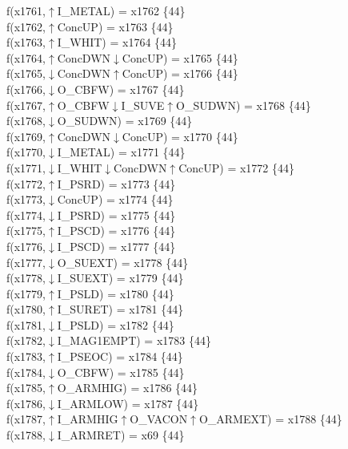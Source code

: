 f(x1761,$\uparrow$I\_METAL) = x1762 \{44\} \\  
f(x1762,$\uparrow$ConcUP) = x1763 \{44\} \\  
f(x1763,$\uparrow$I\_WHIT) = x1764 \{44\} \\  
f(x1764,$\uparrow$ConcDWN$\downarrow$ConcUP) = x1765 \{44\} \\  
f(x1765,$\downarrow$ConcDWN$\uparrow$ConcUP) = x1766 \{44\} \\  
f(x1766,$\downarrow$O\_CBFW) = x1767 \{44\} \\  
f(x1767,$\uparrow$O\_CBFW$\downarrow$I\_SUVE$\uparrow$O\_SUDWN) = x1768 \{44\} \\  
f(x1768,$\downarrow$O\_SUDWN) = x1769 \{44\} \\  
f(x1769,$\uparrow$ConcDWN$\downarrow$ConcUP) = x1770 \{44\} \\  
f(x1770,$\downarrow$I\_METAL) = x1771 \{44\} \\  
f(x1771,$\downarrow$I\_WHIT$\downarrow$ConcDWN$\uparrow$ConcUP) = x1772 \{44\} \\  
f(x1772,$\uparrow$I\_PSRD) = x1773 \{44\} \\  
f(x1773,$\downarrow$ConcUP) = x1774 \{44\} \\  
f(x1774,$\downarrow$I\_PSRD) = x1775 \{44\} \\  
f(x1775,$\uparrow$I\_PSCD) = x1776 \{44\} \\  
f(x1776,$\downarrow$I\_PSCD) = x1777 \{44\} \\  
f(x1777,$\downarrow$O\_SUEXT) = x1778 \{44\} \\  
f(x1778,$\downarrow$I\_SUEXT) = x1779 \{44\} \\  
f(x1779,$\uparrow$I\_PSLD) = x1780 \{44\} \\  
f(x1780,$\uparrow$I\_SURET) = x1781 \{44\} \\  
f(x1781,$\downarrow$I\_PSLD) = x1782 \{44\} \\  
f(x1782,$\downarrow$I\_MAG1EMPT) = x1783 \{44\} \\  
f(x1783,$\uparrow$I\_PSEOC) = x1784 \{44\} \\  
f(x1784,$\downarrow$O\_CBFW) = x1785 \{44\} \\  
f(x1785,$\uparrow$O\_ARMHIG) = x1786 \{44\} \\  
f(x1786,$\downarrow$I\_ARMLOW) = x1787 \{44\} \\  
f(x1787,$\uparrow$I\_ARMHIG$\uparrow$O\_VACON$\uparrow$O\_ARMEXT) = x1788 \{44\} \\  
f(x1788,$\downarrow$I\_ARMRET) = x69 \{44\} \\  
